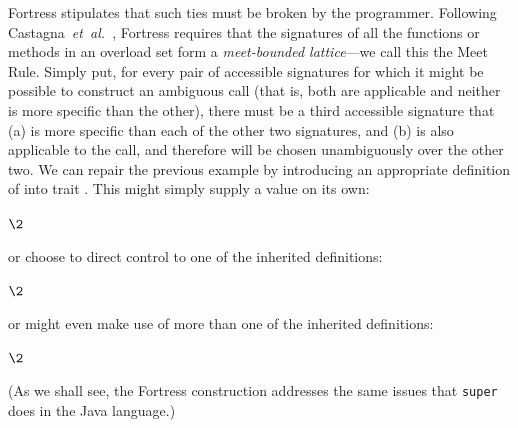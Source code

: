 Fortress stipulates that such ties must be broken by the programmer.
Following Castagna~\emph{et~al.}~\cite{LFP92-OVERLOADED-FUNCTIONS-WITH-SUBTYPING}, Fortress requires that the signatures
of all the functions or methods in an overload set form a \emph{meet-bounded lattice}---we call this the Meet Rule.
Simply put, for every pair of accessible signatures for which it might be possible
to construct an ambiguous call (that is, both are applicable and neither is more specific
than the other), there must be a third accessible signature that (a) is more
specific than each of the other two signatures, and (b) is also applicable to the call, and therefore will
be chosen unambiguously over the other two.
We can repair the previous example by introducing an appropriate definition of  into trait .
This might simply supply a value on its own:
\begin{codeexamplesize}
\begin{tabbing}
\(\2\)
\end{tabbing}
\end{codeexamplesize}
or choose to direct control to one of the inherited definitions:
\begin{codeexamplesize}
\begin{tabbing}
\(\2\) 
\end{tabbing}
\end{codeexamplesize}
or might even make use of more than one of the inherited definitions:
\begin{codeexamplesize}
\begin{tabbing}
\(\2\) 
\end{tabbing}
\end{codeexamplesize}
(As we shall see, the Fortress  construction addresses the same issues that {\tt super} does in the Java language.)

